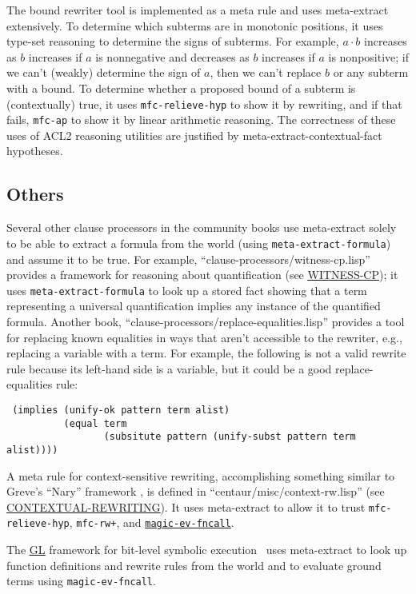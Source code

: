 The bound rewriter tool is implemented as a meta rule and uses
meta-extract extensively.  To determine which subterms are in
monotonic positions, it uses type-set reasoning to determine the signs
of subterms.  For example, $a \cdot b$ increases as $b$ increases if
$a$ is nonnegative and decreases as $b$ increases if $a$ is
nonpositive; if we can't (weakly) determine the sign of $a$, then we
can't replace $b$ or any subterm with a bound.  To determine whether a
proposed bound of a subterm is (contextually) true, it uses
\texttt{mfc-relieve-hyp} to show it by rewriting, and if that fails,
\texttt{mfc-ap} to show it by linear arithmetic reasoning.  The
correctness of these uses of ACL2 reasoning utilities are justified by
meta-extract-contextual-fact hypotheses.

\subsection{Others}

Several other clause processors in the community books use
meta-extract solely to be able to extract a formula from the world
(using \texttt{meta-extract-formula}) and assume it to be true.  For
example, ``clause-processors/witness-cp.lisp'' provides a framework
for reasoning about quantification (see
\href{http://www.cs.utexas.edu/users/moore/acl2/manuals/current/manual/index.html?topic=ACL2\_\_\_\_WITNESS-CP}{\underline{WITNESS-CP}}); it uses
\texttt{meta-extract-formula} to look up a stored fact showing that a
term representing a universal quantification implies any instance
of the quantified formula.  Another book,
``clause-processors/replace-equalities.lisp'' provides a tool for
replacing known equalities in ways that aren't accessible to the
rewriter, e.g., replacing a variable with a term.  For example, the
following is not a valid rewrite rule because its left-hand side is a variable,
but it could be a good replace-equalities rule:
\begin{verbatim}
 (implies (unify-ok pattern term alist)
          (equal term
                 (subsitute pattern (unify-subst pattern term alist))))
\end{verbatim}

A meta rule for context-sensitive rewriting, accomplishing something
similar to Greve's ``Nary'' framework \cite{greve06}, is defined in
``centaur/misc/context-rw.lisp'' (see
\href{http://www.cs.utexas.edu/users/moore/acl2/manuals/current/manual/index.html?topic=ACL2\_\_\_\_CONTEXTUAL-REWRITING}{\underline{CONTEXTUAL-REWRITING}}).
It uses meta-extract to allow it to
trust \texttt{mfc-relieve-hyp}, \texttt{mfc-rw+}, and
\href{http://www.cs.utexas.edu/users/moore/acl2/manuals/current/manual/index.html?topic=ACL2\_\_\_\_MAGIC-EV-FNCALL}{\underline{\tt magic-ev-fncall}}.

The
\href{http://www.cs.utexas.edu/users/moore/acl2/manuals/current/manual/index.html?topic=ACL2\_\_\_\_GL}{\underline{GL}}
framework for bit-level symbolic execution~\cite{gl-diss,
  bit-blasting-GL} uses meta-extract to look up function definitions
and rewrite rules from the world and to evaluate ground terms using
\texttt{magic-ev-fncall}.
